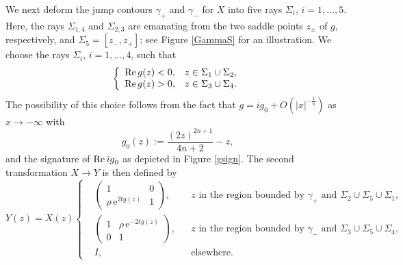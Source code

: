 \documentclass[11pt,a4paper]{article}
\numberwithin{equation}{section}
\def\Re {\mathop{\rm Re}\nolimits}
\begin{document}
We next deform the jump contours $\gamma_+$ and $\gamma_-$ for $X$ into five rays $\Sigma_i$, $i=1,\ldots,5$. Here, the rays $\Sigma_{1,4}$ and $\Sigma_{2,3}$ are emanating from the two saddle points $z_{\pm}$ of $g$, respectively, and $\Sigma_5=[z_-,z_+]$; see Figure \ref{GammaS} for an illustration. We choose the rays $\Sigma_i$, $i=1,\ldots,4$, such that
\begin{equation}\label{eq:ginequa}
\left\{
         \begin{array}{ll}
           \Re g(z)<0, & \hbox{$z\in \Sigma_1 \cup \Sigma_2$,} \\
           \Re g(z)>0, & \hbox{$z\in \Sigma_3 \cup \Sigma_4$.}
         \end{array}
       \right.
\end{equation}
The possibility of this choice follows from the fact that $g=ig_0+O(|x|^{-\frac{1}{n}})$ as $x\to-\infty$ with
\begin{equation}\label{g0g1-expression}
g_0(z):=\frac{(2z)^{2 n+1}}{4n+2}-z,
\end{equation}
and the signature of $\Re{ig}_0$ as depicted in Figure \ref{gsign}. The second transformation $X\to{Y}$ is then defined by
\begin{equation}\label{Y-transformation}
Y(z)=X(z)\left\{\begin{aligned}
&\begin{pmatrix} 1 & 0 \\ \rho\,\mathrm{e}^{2tg(z)} & 1\end{pmatrix}, && \textrm{$z$ in the region bounded by $\gamma_+$ and $\Sigma_2\cup\Sigma_5\cup\Sigma_1$,}\\
&\begin{pmatrix} 1 & \rho\,\mathrm{e}^{-2tg(z)} \\ 0 & 1\end{pmatrix}, &&
\textrm{$z$ in the region bounded by $\gamma_-$ and $\Sigma_3\cup\Sigma_5\cup\Sigma_4$,}
\\
&I , &&
\textrm{elsewhere.}
\end{aligned}\right.
\end{equation}


\end{document}
